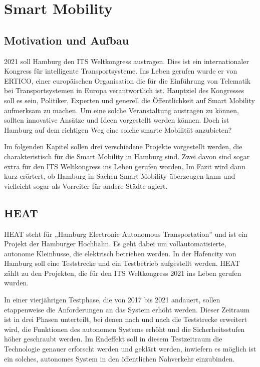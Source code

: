 \section{Smart Mobility}
\label{sec:smart_mobility}

\subsection{Motivation und Aufbau}

2021 soll Hamburg den ITS Weltkongress austragen. Dies ist ein internationaler Kongress für intelligente Transportsysteme.
Ins Leben gerufen wurde er von ERTICO, einer europäischen Organisation die für die Einführung von Telematik bei Transportsystemen in Europa verantwortlich ist.
Hauptziel des Kongresses soll es sein, Politiker, Experten und generell die Öffentlichkeit auf Smart Mobility aufmerksam zu machen.
Um eine solche Veranstaltung austragen zu können, sollten innovative Ansätze und Ideen vorgestellt werden können.
Doch ist Hamburg auf dem richtigen Weg eine solche smarte Mobilität anzubieten? \autocite[vgl.][]{ITSWorldCongress.2020}

Im folgenden Kapitel sollen drei verschiedene Projekte vorgestellt werden, die charakteristisch für die Smart Mobility in Hamburg sind.
Zwei davon sind sogar extra für den ITS Weltkongress ins Leben gerufen worden.
Im Fazit wird dann kurz erörtert, ob Hamburg in Sachen Smart Mobility überzeugen kann und vielleicht sogar als Vorreiter für andere Städte agiert. 

\subsection{HEAT}

HEAT steht für „Hamburg Electronic Autonomous Transportation” und ist ein Projekt der Hamburger Hochbahn.
Es geht dabei um vollautomatisierte, autonome Kleinbusse, die elektrisch betrieben werden. In der Hafencity von Hamburg soll eine Teststrecke und ein Testbetrieb aufgestellt werden. HEAT zählt zu den Projekten, die für den ITS Weltkongress 2021 ins Leben gerufen wurden. \autocite[vgl.][]{SmartCityKompass.2020c}

In einer vierjährigen Testphase, die von 2017 bis 2021 andauert, sollen etappenweise die Anforderungen an das System erhöht werden.
Dieser Zeitraum ist in drei Phasen unterteilt, bei denen nach und nach die Teststrecke erweitert wird, die Funktionen des autonomen Systems erhöht und die Sicherheitsstufen höher geschraubt werden.
Im Endeffekt soll in diesem Testzeitraum die Technologie genauer erforscht werden und geklärt werden, inwiefern es möglich ist ein solches, autonomes System in den öffentlichen Nahverkehr einzubinden. \autocite[vgl.][]{HOCHBAHN.2020}


